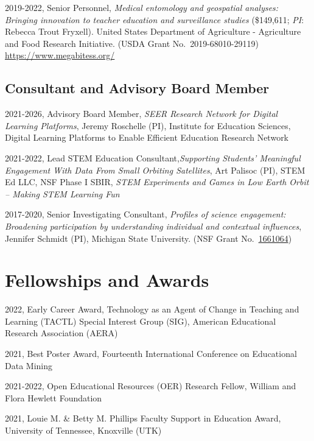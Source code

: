 \documentclass[
  14,
]{article}
\begin{document}
2019-2022, Senior Personnel, \emph{Medical entomology and geospatial
analyses: Bringing innovation to teacher education and surveillance
studies} (\$149,611; \emph{PI}: Rebecca Trout Fryxell). United States
Department of Agriculture - Agriculture and Food Research Initiative.
(USDA Grant No.~2019-68010-29119) \url{https://www.megabitess.org/}

\hypertarget{consultant-and-advisory-board-member}{%
\subsection{Consultant and Advisory Board
Member}\label{consultant-and-advisory-board-member}}

2021-2026, Advisory Board Member, \emph{SEER Research Network for
Digital Learning Platforms}, Jeremy Roschelle (PI), Institute for
Education Sciences, Digital Learning Platforms to Enable Efficient
Education Research Network

2021-2022, Lead STEM Education Consultant,\emph{Supporting Students'
Meaningful Engagement With Data From Small Orbiting Satellites}, Art
Palisoc (PI), STEM Ed LLC, NSF Phase I SBIR, \emph{STEM Experiments and
Games in Low Earth Orbit -- Making STEM Learning Fun}

2017-2020, Senior Investigating Consultant, \emph{Profiles of science
engagement: Broadening participation by understanding individual and
contextual influences}, Jennifer Schmidt (PI), Michigan State
University. (NSF Grant
No.~\href{https://nsf.gov/awardsearch/showAward?AWD_ID=1661064\&HistoricalAwards=false}{1661064})

\hypertarget{fellowships-and-awards}{%
\section{Fellowships and Awards}\label{fellowships-and-awards}}

2022, Early Career Award, Technology as an Agent of Change in Teaching
and Learning (TACTL) Special Interest Group (SIG), American Educational
Research Association (AERA)

2021, Best Poster Award, Fourteenth International Conference on
Educational Data Mining

2021-2022, Open Educational Resources (OER) Research Fellow, William and
Flora Hewlett Foundation

2021, Louie M. \& Betty M. Phillips Faculty Support in Education Award,
University of Tennessee, Knoxville (UTK)
\end{document}
